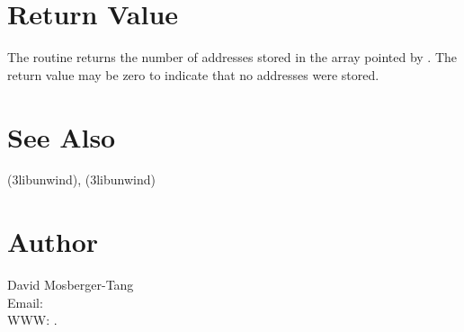 \documentclass{article}
\begin{document}
\section{Return Value}

The routine returns the number of addresses stored in the array pointed by
. The return value may be zero to indicate that no addresses were
stored.

\section{See Also}

(3libunwind),
(3libunwind)

\section{Author}

\noindent
David Mosberger-Tang\\
Email: \\
WWW: .
\LatexManEnd
\end{document}
